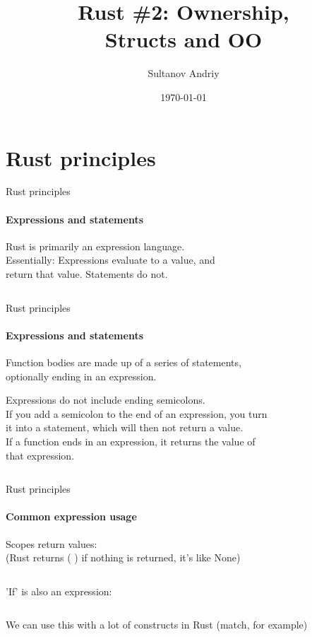 \documentclass[usenames,dvipsnames,10pt,aspectratio=169]{beamer}
\title[Rust \#2]{Rust \#2: Ownership,\\ Structs and OO}
\date[\today]{\small\today}
\author[Sultanov Andriy]{Sultanov Andriy}
\institute{APPS@UCU}
\begin{document}
\begin{frame}
\titlepage
\end{frame}

\begin{frame}{\contentsname}
\tableofcontents
\end{frame}


\section{Rust principles}
\begin{frame}{Rust principles}
\framesubtitle{Expressions and statements}
\large{\textcolor{ucuyellow}{Rust is primarily an expression language.\\}}
\vspace{0.5cm}
\normalsize
Essentially: Expressions evaluate to a value, and\\
return that value. Statements do not.
\vspace{0.5cm}
\inputminted[fontsize=\large]{rust}{code/expression1.rs}
\end{frame}

\begin{frame}{Rust principles}
\framesubtitle{Expressions and statements}
\normalsize
Function bodies are made up of a series of statements, \\
optionally ending in an expression.

\vspace{0.5cm}
Expressions do not include ending semicolons.\\

\vspace{0.5cm}
If you add a semicolon to the end of an expression, you turn \\
it into a statement, which will then not return a value.\\
If a function ends in an expression, it returns the value of\\
that expression.
\vspace{0.5cm}
\inputminted[fontsize=\large]{rust}{code/expression2.rs}
\end{frame}

\begin{frame}{Rust principles}
\framesubtitle{Common expression usage}
Scopes return values:\\
(Rust returns \textcolor{ucuyellow}{( )} if nothing is returned, it's like None)
\inputminted[fontsize=\large]{rust}{code/expression3.rs}
\vspace{0.5cm}
'If' is also an expression:
\inputminted[fontsize=\large]{rust}{code/expression4.rs}
\vspace{0.5cm}
We can use this with a lot of constructs in Rust 
(\textcolor{ucuyellow}{match}, for example)
\end{frame}
\end{document}
